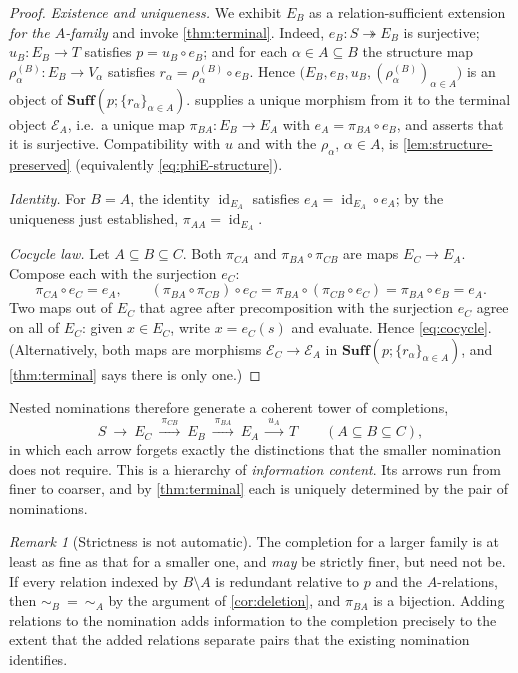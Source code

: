 \documentclass[11pt,reqno]{amsart}
\theoremstyle{plain}
\theoremstyle{definition}
\theoremstyle{remark}
\newtheorem{remark}[theorem]{Remark}
\numberwithin{equation}{section}
\DeclareMathOperator{\id}{id}
\begin{document}
\begin{proof}
\emph{Existence and uniqueness.} We exhibit $E_B$ as a relation-sufficient extension \emph{for the
$A$-family} and invoke \cref{thm:terminal}. Indeed, $e_B\colon S\twoheadrightarrow E_B$ is
surjective; $u_B\colon E_B\to T$ satisfies $p=u_B\circ e_B$; and for each $\alpha\in A\subseteq B$
the structure map $\rho_\alpha^{(B)}\colon E_B\to V_\alpha$ satisfies
$r_\alpha=\rho_\alpha^{(B)}\circ e_B$. Hence
$\bigl(E_B,e_B,u_B,(\rho_\alpha^{(B)})_{\alpha\in A}\bigr)$ is an object of
$\mathbf{Suff}(p;\{r_\alpha\}_{\alpha\in A})$.  supplies a unique morphism from it
to the terminal object $\mathcal E_A$, i.e.\ a unique map $\pi_{BA}\colon E_B\to E_A$ with
$e_A=\pi_{BA}\circ e_B$, and asserts that it is surjective. Compatibility with $u$ and with the
$\rho_\alpha$, $\alpha\in A$, is \cref{lem:structure-preserved} (equivalently
\eqref{eq:phiE-structure}).

\emph{Identity.} For $B=A$, the identity $\id_{E_A}$ satisfies $e_A=\id_{E_A}\circ e_A$; by the
uniqueness just established, $\pi_{AA}=\id_{E_A}$.

\emph{Cocycle law.} Let $A\subseteq B\subseteq C$. Both $\pi_{CA}$ and $\pi_{BA}\circ\pi_{CB}$ are
maps $E_C\to E_A$. Compose each with the surjection $e_C$:
\[
\pi_{CA}\circ e_C=e_A,
\qquad
(\pi_{BA}\circ\pi_{CB})\circ e_C
=\pi_{BA}\circ(\pi_{CB}\circ e_C)
=\pi_{BA}\circ e_B
=e_A .
\]
Two maps out of $E_C$ that agree after precomposition with the surjection $e_C$ agree on all of
$E_C$: given $x\in E_C$, write $x=e_C(s)$ and evaluate. Hence \eqref{eq:cocycle}. (Alternatively,
both maps are morphisms $\mathcal E_C\to\mathcal E_A$ in $\mathbf{Suff}(p;\{r_\alpha\}_{\alpha\in
A})$, and \cref{thm:terminal} says there is only one.)
\end{proof}

Nested nominations therefore generate a coherent tower of completions,
\begin{equation}
\label{eq:tower-nested}
S\ \longrightarrow\ E_C\ \xrightarrow{\ \pi_{CB}\ }\ E_B\ \xrightarrow{\ \pi_{BA}\ }\ E_A\
\xrightarrow{\ u_A\ }\ T
\qquad(A\subseteq B\subseteq C),
\end{equation}
in which each arrow forgets exactly the distinctions that the smaller nomination does not require.
This is a hierarchy of \emph{information content}. Its arrows run from finer to coarser, and by
\cref{thm:terminal} each is uniquely determined by the pair of nominations.

\begin{remark}[Strictness is not automatic]
\label{rem:not-strict}
The completion for a larger family is at least as fine as that for a smaller one, and \emph{may} be
strictly finer, but need not be. If every relation indexed by $B\setminus A$ is redundant relative to
$p$ and the $A$-relations, then $\sim_B\ =\ \sim_A$ by the argument of \cref{cor:deletion}, and
$\pi_{BA}$ is a bijection. Adding relations to the nomination adds information to the completion
precisely to the extent that the added relations separate pairs that the existing nomination
identifies.
\end{remark}
\end{document}
